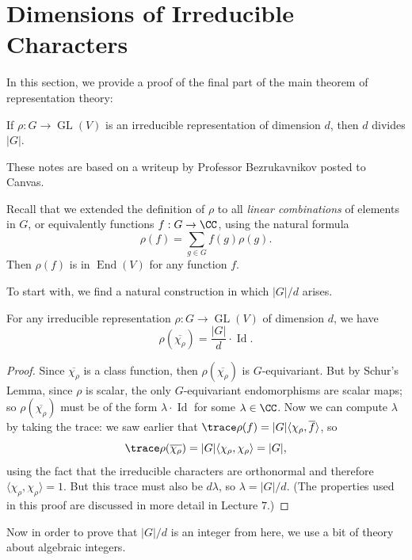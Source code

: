\section{Dimensions of Irreducible Characters}

In this section, we provide a proof of the final part of the main theorem of representation theory:

\begin{theorem} \label{final part of thm}
If $\rho : G \to \operatorname{GL}(V)$ is an irreducible representation of dimension $d$, then $d$ divides $|G|$. 
\end{theorem}

These notes are based on a writeup by Professor Bezrukavnikov posted to Canvas. 

Recall that we extended the definition of $\rho$ to all \emph{linear combinations} of elements in $G$, or equivalently functions $f : G \to \CC$, using the natural formula \[\rho(f) = \sum_{g \in G} f(g)\rho(g).\] Then $\rho(f)$ is in $\operatorname{End}(V)$ for any function $f$. 

To start with, we find a natural construction in which $|G|/d$ arises. 

\begin{proposition}
    For any irreducible representation $\rho : G \to \operatorname{GL}(V)$ of dimension $d$, we have  \[\rho(\overline{\chi_\rho}) = \frac{|G|}{d} \cdot \operatorname{Id}.\] 
\end{proposition}

\begin{proof}
    Since $\overline{\chi_\rho}$ is a class function, then $\rho(\overline{\chi_\rho})$ is $G$-equivariant. But by Schur's Lemma, since $\rho$ is scalar, the only $G$-equivariant endomorphisms are scalar maps; so $\rho(\overline{\chi_\rho})$ must be of the form $\lambda\cdot \operatorname{Id}$ for some $\lambda \in \CC$. Now we can compute $\lambda$ by taking the trace: we saw earlier that $\trace \rho(f) = |G|\langle \chi_\rho, \overline{f}\rangle$, so \[\trace \rho(\overline{\chi_\rho}) = |G|\langle \chi_\rho, \chi_\rho \rangle = |G|,\] using the fact that the irreducible characters are orthonormal and therefore $\langle \chi_\rho, \chi_\rho \rangle = 1$. But this trace must also be $d\lambda$, so $\lambda = |G|/d$. (The properties used in this proof are discussed in more detail in Lecture $7$.)
\end{proof}

Now in order to prove that $|G|/d$ is an integer from here, we use a bit of theory about algebraic integers. 

